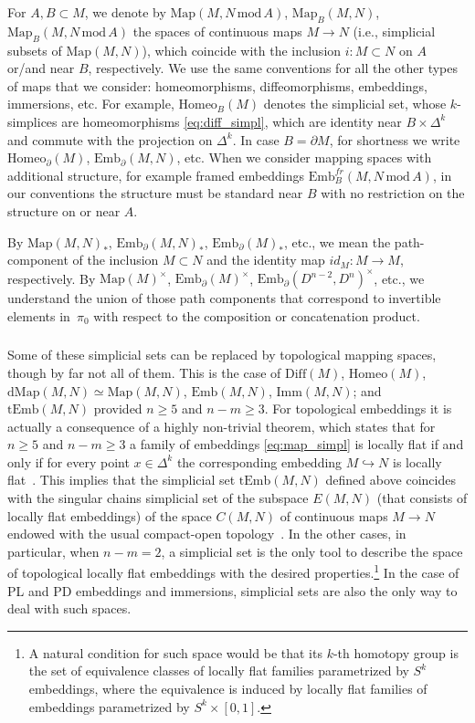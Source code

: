 \documentclass[11pt]{amsart}
\theoremstyle{definition}
\newcommand{\Emb}{\mathrm{Emb}}
\newcommand{\Imm}{\mathrm{Imm}}
\newcommand{\tEmb}{\mathrm{tEmb}}
\newcommand{\Map}{\mathrm{Map}}
\newcommand{\dMap}{\mathrm{dMap}}
\newcommand{\plMap}{\mathrm{plMap}}
\newcommand{\pdMap}{\mathrm{pdMap}}
\newcommand{\Diff}{\mathrm{Diff}}
\newcommand{\Homeo}{\mathrm{Homeo}}
\newcommand{\mmod}{\,\mathrm{mod}\,}
\numberwithin{equation}{section}
\begin{document}
For $A,B\subset M$, we denote by $\Map(M,N\mmod A)$, $\Map_B(M,N)$, $\Map_B(M,N\mmod A)$ the spaces of continuous maps $M\to N$
(i.e., simplicial subsets of $\Map(M,N)$), which coincide with the inclusion $i\colon M\subset N$ on $A$ or/and near $B$, respectively. We use the same conventions for all the other types of maps that we consider: homeomorphisms, diffeomorphisms, embeddings, immersions, etc. For example, 
$\Homeo_B(M)$ denotes the simplicial set, whose $k$-simplices are homeomorphisms \eqref{eq:diff_simpl}, which are identity near $B\times\Delta^k$
and commute with the projection on $\Delta^k$. In case $B=\partial M$, for shortness we write $\Homeo_\partial (M)$, $\Emb_\partial(M,N)$, etc. 
When we consider mapping spaces with additional structure, for example framed embeddings $\Emb^{fr}_B(M,N\mmod A)$, in our conventions the structure must be standard near $B$ with no restriction on the structure on or near $A$.

By $\Map(M,N)_*$, $\Emb_\partial(M,N)_*$, $\Emb_\partial(M)_*$, etc., we mean the path-component of the inclusion $M\subset N$ and the identity map $id_M\colon M\to M$, respectively.
By $\Map(M)^\times$, $\Emb_\partial(M)^\times$, $\Emb_\partial(D^{n-2},D^n)^\times$, etc., we understand the union of those path components that correspond to invertible elements in~$\pi_0$ with respect to the composition or concatenation  product.

\subsubsection{} Some of these simplicial sets can be replaced by topological mapping spaces, though by far not all of them. This is the case of $\Diff(M)$, $\Homeo(M)$,
$\dMap(M,N)\simeq \Map(M,N)$, $\Emb(M,N)$, $\Imm(M,N)$; %
and $\tEmb(M,N)$ provided $n\geq 5$ and $n-m\geq 3$. 
For topological embeddings it is actually a consequence of a highly non-trivial theorem, which states that for $n\geq 5$ and $n-m\geq 3$ a family of
 embeddings \eqref{eq:map_simpl}
is locally flat if and only if for every point $x\in\Delta^k$ the corresponding embedding $M\hookrightarrow N$ is locally flat~\cite{Chernav}. This implies that the simplicial set 
$\tEmb(M,N)$ defined above coincides with the singular chains simplicial set of the subspace $E(M,N)$ (that consists of locally flat embeddings) of the space $C(M,N)$ of continuous maps $M\to N$ endowed with the usual compact-open topology~\cite{Lashof}. In the other cases, in particular, when $n-m=2$, a simplicial set
is the only tool %
 to describe the space of topological locally flat embeddings with the desired properties.\footnote{A natural condition for such space would be that 
its $k$-th homotopy group is the set of equivalence classes of locally flat families parametrized by $S^k$ embeddings, where the equivalence is induced by  locally flat families of embeddings parametrized by $S^k\times [0,1]$.} In the case of PL and PD embeddings and immersions,  simplicial sets are also the only way %
to deal with such spaces. 
\end{document}
